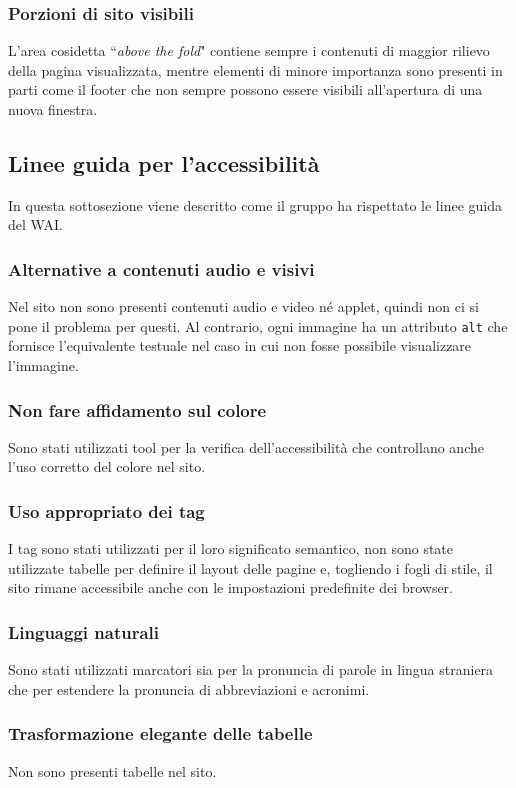 \subsubsection{Porzioni di sito visibili}
L'area cosidetta ``\textit{above the fold}" contiene sempre i contenuti di maggior
rilievo della pagina visualizzata, mentre elementi di minore importanza sono
presenti in parti come il footer che non sempre possono essere visibili all'apertura di una nuova finestra.

\subsection{Linee guida per l'accessibilità}
In questa sottosezione viene descritto come il gruppo ha rispettato le linee
guida del WAI.

\subsubsection{Alternative a contenuti audio e visivi}
Nel sito non sono presenti contenuti audio e video né applet, quindi non ci si
pone il problema per questi. Al contrario, ogni immagine ha un attributo
\texttt{alt} che fornisce l'equivalente testuale nel caso in cui non fosse
possibile visualizzare l'immagine.

\subsubsection{Non fare affidamento sul colore}
Sono stati utilizzati tool per la verifica dell'accessibilità che controllano
anche l'uso corretto del colore nel sito.

\subsubsection{Uso appropriato dei tag}
I tag sono stati utilizzati per il loro significato semantico, non sono state
utilizzate tabelle per definire il layout delle pagine e, togliendo i fogli di
stile, il sito rimane accessibile anche con le impostazioni predefinite dei
browser.

\subsubsection{Linguaggi naturali}
Sono stati utilizzati marcatori sia per la pronuncia di parole in lingua
straniera che per estendere la pronuncia di abbreviazioni e acronimi.

\subsubsection{Trasformazione elegante delle tabelle}
Non sono presenti tabelle nel sito.

